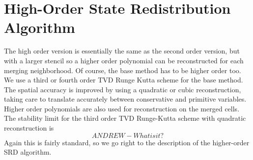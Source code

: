 \section{High-Order State Redistribution Algorithm}\label{sec:ho}

The high order version is essentially the same as the second order
version, but with a larger stencil so a higher order polynomial can be
reconstructed for each merging neighborhood. Of course, the base method
has to be higher order too. We use a third or fourth order TVD Runge Kutta scheme
for the base method.  The spatial accuracy is improved by using a
quadratic or cubic reconstruction, taking care to translate
accurately between conservative and primitive variables.  Higher
order polynomials are also used for reconstruction on the merged cells. 
The stability limit for the third order TVD Runge-Kutta scheme with
quadratic reconstruction is
\begin{equation}
ANDREW - What is it?
\end{equation}
Again this is fairly standard, so we go right to the description of the higher-order SRD algorithm.

